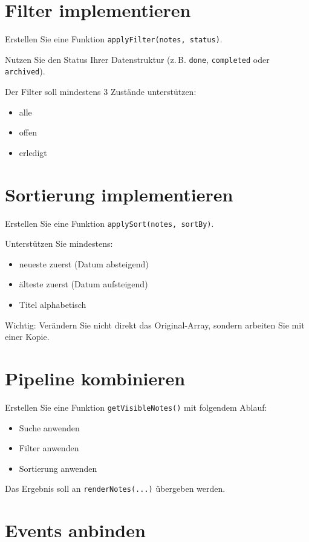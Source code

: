\documentclass[a4paper,12pt]{article}
\begin{document}
\section{Filter implementieren}

Erstellen Sie eine Funktion \texttt{applyFilter(notes, status)}.

Nutzen Sie den Status Ihrer Datenstruktur (z.\,B. \texttt{done}, \texttt{completed} oder \texttt{archived}).

Der Filter soll mindestens 3 Zustände unterstützen:
\begin{itemize}
    \item alle
    \item offen
    \item erledigt
\end{itemize}

\section{Sortierung implementieren}

Erstellen Sie eine Funktion \texttt{applySort(notes, sortBy)}.

Unterstützen Sie mindestens:
\begin{itemize}
    \item neueste zuerst (Datum absteigend)
    \item älteste zuerst (Datum aufsteigend)
    \item Titel alphabetisch
\end{itemize}

Wichtig: Verändern Sie nicht direkt das Original-Array, sondern arbeiten Sie mit einer Kopie.

\section{Pipeline kombinieren}

Erstellen Sie eine Funktion \texttt{getVisibleNotes()} mit folgendem Ablauf:
\begin{itemize}
    \item Suche anwenden
    \item Filter anwenden
    \item Sortierung anwenden
\end{itemize}

Das Ergebnis soll an \texttt{renderNotes(...)} übergeben werden.

\section{Events anbinden}
\end{document}

